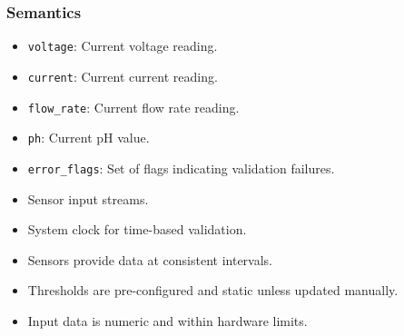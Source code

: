 \documentclass[12pt, titlepage]{article}
\begin{document}
\subsubsection{Semantics}
\begin{description}

  \item[State Variables:]
  \item
    \begin{itemize}
      \item \texttt{voltage}: Current voltage reading.
    \end{itemize}
    \item
    \begin{itemize}
      \item \texttt{current}: Current current reading.
    \end{itemize}
    \item 
    \begin{itemize}
      \item \texttt{flow\_rate}: Current flow rate reading.
    \end{itemize}
    \item 
    \begin{itemize}
      \item \texttt{ph}: Current pH value.
    \end{itemize}
    \item 
    \begin{itemize}
      \item \texttt{error\_flags}: Set of flags indicating validation failures.
    \end{itemize}

  \item[Environment Variables:]
  \item
    \begin{itemize}
      \item Sensor input streams.
    \end{itemize}
    \item
    \begin{itemize}
      \item System clock for time-based validation.
    \end{itemize}

  \item[Assumptions:]
  \item
    \begin{itemize}
      \item Sensors provide data at consistent intervals.
    \end{itemize}
    \item
    \begin{itemize}
      \item Thresholds are pre-configured and static unless updated manually.
    \end{itemize}
    \item 
    \begin{itemize}
      \item Input data is numeric and within hardware limits.
    \end{itemize}


\end{description}
\end{document}
